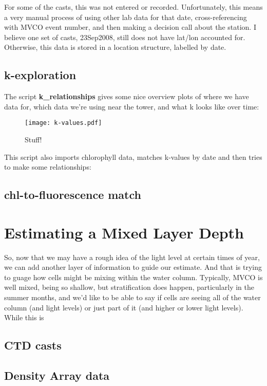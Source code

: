 \documentclass[11pt]{article}
\begin{document}
For some of the casts, this was not entered or recorded. Unfortunately, this means a very manual process of using other lab data for that date, cross-referencing with MVCO event number, and then making a decision call about the station. I believe one set of casts, 23Sep2008, still does not have lat/lon accounted for. Otherwise, this data is stored in a location structure, labelled by date.

\subsection{k-exploration}

The script \textbf{k\_relationships} gives some nice overview plots of where we have data for, which data we're using near the tower, and what k looks like over time:

 
 \begin{figure}[h]
\centering
\texttt{[image: k-values.pdf]}
\caption{Stuff!}
\end{figure}

This script also imports chlorophyll data, matches k-values by date and then tries to make some relationships:

\subsection{chl-to-fluorescence match}


\section{Estimating a Mixed Layer Depth}

So, now that we may have a rough idea of the light level at certain times of year, we can add another layer of information to guide our estimate. And that is trying to guage how cells might be mixing within the water column. Typically, MVCO is well mixed, being so shallow, but stratification does happen, particularly in the summer months, and we'd like to be able to say if cells are seeing all of the water column (and light levels) or just part of it (and higher or lower light levels). While this is 

\subsection{CTD casts}
\subsection{Density Array data}
\end{document}
